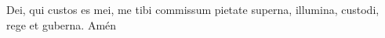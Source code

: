  Dei, qui custos es mei, me tibi commissum pietate superna, illumina, custodi, rege et guberna. Amén